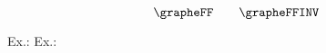 \documentclass[8pt]{article} %
\begin{document}

\raisebox{-\height}{\exoLNA} \qquad\qquad 
\raisebox{-\height}{\exoLNB}


\raisebox{-\height}{\exoSQRTA} \qquad
\raisebox{-\height}{\exoSQRTB} \qquad
\raisebox{-\height}{\exoSQRTC} 

$$
\grapheFF \qquad \grapheFFINV
$$


Ex.:\quad 
\raisebox{-.5\height}{\grapheXXTOT \quad \grapheXXRED \quad \grapheSQRT}
Ex.:\quad 
\raisebox{-.5\height}{\grapheSINTOT \quad \grapheSINRED \quad \grapheASINRED}

\end{document}
